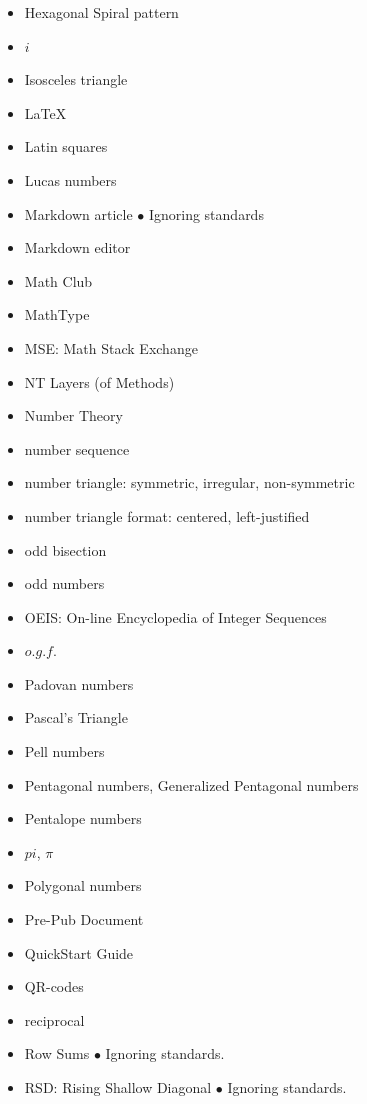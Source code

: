 \documentclass[12pt]{article}
\begin{document}
\begin{itemize}
        \item Hexagonal Spiral pattern
        \item $ i $
        \item Isosceles triangle
        \item \LaTeX{}
        
        \item Latin squares
        \item Lucas numbers
        \item Markdown article $ \bullet $ Ignoring standards
        \item Markdown editor
        
        \item Math Club
        \item MathType
        \item MSE: Math Stack Exchange
        \item NT Layers (of Methods)
        
        \item Number Theory
        \item number sequence
        \item number triangle: symmetric, irregular, non-symmetric
        \item number triangle format: centered, left-justified
        
        \item odd bisection
        \item odd numbers
        \item OEIS: On-line Encyclopedia of Integer Sequences
        \item $ o.g.f. $
        \item Padovan numbers
        
        \item Pascal's Triangle
        \item Pell numbers
        \item Pentagonal numbers, Generalized Pentagonal numbers
        \item Pentalope numbers
        
        \item $ pi $, $ \pi $
        \item Polygonal numbers
        \item Pre-Pub Document
        \item QuickStart Guide
        
        \item QR-codes
        \item reciprocal
        \item Row Sums $ \bullet $ Ignoring standards.
        \item RSD: Rising Shallow Diagonal $ \bullet $ Ignoring standards.
        

\end{itemize}
\end{document}
